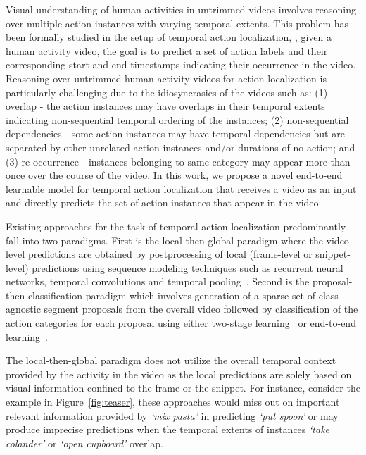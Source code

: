 \documentclass[10pt,twocolumn,letterpaper]{article}
\begin{document}
Visual understanding of human activities in untrimmed videos involves reasoning over multiple action instances with varying temporal extents. This problem has been formally studied in the setup of temporal action localization,  \ie, given a human activity video, the goal is to predict a set of action labels and their corresponding start and end timestamps indicating their occurrence in the video. Reasoning over untrimmed human activity videos for action localization is particularly challenging due to the idiosyncrasies of the videos 
such as: (1) overlap - the action instances may have overlaps in their temporal extents indicating non-sequential temporal ordering of the instances; (2) non-sequential dependencies - some action instances may have temporal dependencies but are separated by other unrelated action instances and/or durations of no action; and (3) re-occurrence - instances belonging to same category may appear more than once over the course of the video. 
In this work, we propose a novel end-to-end learnable model for temporal action localization that receives a video as an input and directly predicts the set of action instances that appear in the video. 

Existing approaches for the task of temporal action localization predominantly fall into two paradigms. First is the local-then-global paradigm where the video-level predictions are obtained by postprocessing of local (\ie frame-level or snippet-level) predictions using sequence modeling techniques such as recurrent neural networks, temporal convolutions and temporal pooling~\cite{richard2016temporal,yuan2017temporal,dave2017predictive, singh2016multi, ma2016learning, yeung2016end,lea2017temporal,piergiovanni2018learning,karpathy2014large,piergiovanni2018learning}. Second is the proposal-then-classification paradigm which involves generation of a sparse set of class agnostic segment proposals from the overall video followed by classification of the action categories for each proposal using either two-stage learning~\cite{caba2016fast,buch2017sst,heilbron2017scc,escorcia2016daps,shou2016temporal,shou2017cdc,zhao2017temporal,zhao2020bottom} or end-to-end learning~\cite{dai2017temporal,gao2017turn,chao2018rethinking,xu2017r,zeng2019graph}. 

The local-then-global paradigm does not utilize the overall temporal context provided by the activity in the video as the local predictions are solely based on visual information confined to the frame or the snippet. For instance, consider the example in Figure~\ref{fig:teaser}, these approaches would miss out on important relevant information provided by \textit{`mix pasta'} in predicting \textit{`put spoon'} or may produce imprecise predictions when the temporal extents of instances \textit{`take colander'} or \textit{`open cupboard'} overlap. 
\end{document}
